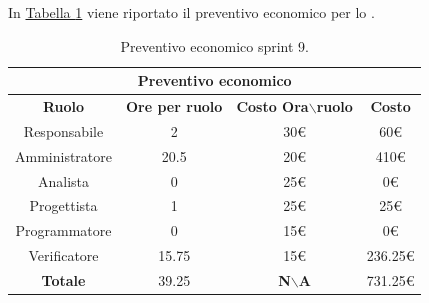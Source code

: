 In \hyperref[tab:sprint9_preventivo_economico]{Tabella \ref{tab:sprint9_preventivo_economico}} viene riportato il preventivo economico per lo .
\begin{table}[H]
    \centering
    \begin{tabular}{|c|c|c|c|}
        \hline
            \multicolumn{4}{|c|}{\textbf{Preventivo economico}} \\ 
        \hline
            \textbf{Ruolo} & \textbf{Ore per ruolo} & \textbf{Costo Ora$\backslash$ruolo} & \textbf{Costo} \\
        \hline
        Responsabile & 2 & 30€ & 60€ \\
        \hline
        Amministratore & 20.5 & 20€ & 410€ \\
        \hline
        Analista & 0 & 25€ & 0€ \\
        \hline
        Progettista & 1 & 25€ & 25€ \\
        \hline
        Programmatore & 0 & 15€ & 0€ \\
        \hline
        Verificatore & 15.75 & 15€ & 236.25€ \\
        \hline 
        \textbf{Totale} & 39.25 & \textbf{N$\backslash$A} & 731.25€  \\
        \hline
    \end{tabular}
    \caption{Preventivo economico sprint 9.}
    \label{tab:sprint9_preventivo_economico}
\end{table}